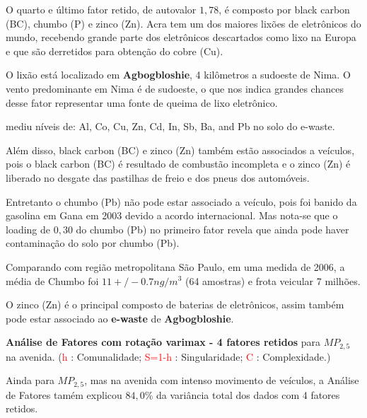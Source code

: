 O quarto e último fator retido, de autovalor $1,78$, é composto 
por black carbon (BC), chumbo (P) e zinco (Zn). 
Acra tem um dos maiores lixões de eletrônicos do mundo, recebendo
grande parte dos eletrônicos descartados como lixo na Europa e que são derretidos
para obtenção do cobre (Cu). 

O lixão está localizado em \textbf{Agbogbloshie}, 4 kilômetros a sudoeste de Nima. 
O vento predominante em Nima é de sudoeste, o que nos indica grandes chances 
desse fator representar uma fonte de queima de lixo eletrônico.

\citep{asante2012} mediu níveis de:
Al, Co, Cu, Zn, Cd, In, Sb, Ba, and Pb no solo do e-waste.

Além disso, black carbon (BC) e zinco (Zn) também estão associados a veículos, 
pois o black carbon (BC) é resultado de combustão incompleta e o zinco (Zn) é
liberado no desgate das pastilhas de freio e dos pneus dos automóveis. 

Entretanto o chumbo (Pb) não pode estar associado a veículo, pois 
foi banido da gasolina em Gana em 2003 devido a acordo internacional. 
Mas nota-se que o loading de $0,30$ do chumbo (Pb) no primeiro fator revela 
que ainda pode haver contaminação do solo por chumbo (Pb).

Comparando com região metropolitana São Paulo, em uma medida de 2006, a média de Chumbo foi $11 +/- 0.7 ng/m^3$  
(64 amostras) e frota veicular 7 milhões. 

O zinco (Zn) é o principal composto de baterias de eletrônicos, assim também 
pode estar associado ao \textbf{e-waste} de \textbf{Agbogbloshie}.

\begin{table}[H]
  \caption{\textbf{Análise de Fatores com rotação varimax - 4 fatores retidos} 
             para $MP_{2,5}$ na avenida.
           (\textcolor{red}{h} : Comunalidade; 
           \textcolor{red}{S=1-h} : Singularidade; 
           \textcolor{red}{C} : Complexidade.)}
  
\end{table}

Ainda para $MP_{2,5}$, mas na avenida com intenso movimento de veículos,
a Análise de Fatores tamém explicou $84,0\%$ da variância total 
dos dados com 4 fatores retidos.

